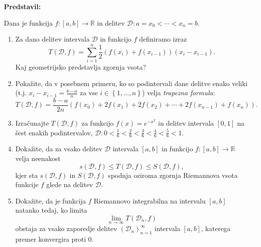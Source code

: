 \textbf{Predstavil:} 

Dana je funkcija $f:[a,b] \to \mathbb{R}$ in delitev $\mathcal{D}: a = x_{0} < \cdots < x_{n} = b$. 
\begin{enumerate}
\item Za dano delitev intervala $\mathcal{D}$ in funkcijo $f$ definiramo izraz \[T(\mathcal{D}, f) = \sum_{i=1}^{n} \frac{1}{2} \left( f(x_{i}) + f(x_{i-1}) \right)\left(x_{i} - x_{i-1} \right).\]
Kaj geometrijsko predstavlja zgornja vsota?
\item Pokažite, da v posebnem primeru, ko so podintervali dane delitve enako veliki (t.j. $x_{i} - x_{i-1} = \frac{b-a}{n}$ za vse $i \in \left\{ 1, \dots, n \right\}$) velja \emph{trapezna formula}:
\[T(\mathcal{D},f) = \frac{b-a}{2n}\left( f(x_{0}) + 2 f(x_{1}) + 2 f(x_{2}) + \cdots + 2 f(x_{n-1}) + f(x_{n}) \right).\]
\item Izračunajte $T(\mathcal{D},f)$ za funkcijo $f(x) = e^{-x^{2}}$ in delitev intervala $[0,1]$ na šest enakih podintervalov, $\mathcal{D}: 0 < \frac{1}{6} < \frac{2}{6} < \frac{3}{6} < \frac{4}{6} < \frac{5}{6} < 1$. 
\item Dokažite, da za vsako delitev $\mathcal{D}$ intervala $[a,b]$ in funkcijo $f:[a,b] \to \mathbb{R}$ velja neenakost \[s(\mathcal{D},f) \leq T(\mathcal{D},f) \leq S(\mathcal{D},f),\] kjer sta $s(\mathcal{D},f)$ in $S(\mathcal{D},f)$ spodnja oziroma zgornja Riemannova vsota funkcije $f$ glede na delitev $\mathcal{D}$.
\item Dokažite, da je funkcija $f$ Riemannovo integrabilna na intervalu $[a,b]$ natanko tedaj, ko limita \[\lim_{n \to \infty} T(\mathcal{D}_{n},f)\] obstaja za vsako zaporedje delitev $\left( \mathcal{D}_{n} \right)_{n=1}^{\infty}$ intervala $[a,b]$, katerega premer konvergira proti $0$. 
\end{enumerate}

